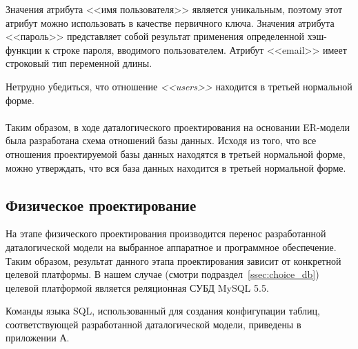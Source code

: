 Значения атрибута <<имя пользователя>> является уникальным, 
поэтому этот атрибут можно использовать в качестве первичного ключа.
Значения атрибута <<пароль>> представляет собой результат применения определенной хэш-функции
к строке пароля, вводимого пользователем.
Атрибут <<email>> имеет строковый тип переменной длины.

Нетрудно убедиться, что отношение \textit{<<users>>} находится в третьей
нормальной форме.

\paragraph{}
Таким образом, в ходе даталогического проектирования на основании ER-модели была разработана схема 
отношений базы данных.
Исходя из того, что все отношения проектируемой базы данных находятся в третьей нормальной форме,
можно утверждать, что вся база данных находится в третьей нормальной форме.


\subsection{Физическое проектирование}
\label{ssub:db_physical_stage}

На этапе физического проектирования производится перенос разработанной даталогической модели
на выбранное аппаратное и программное обеспечение.
Таким образом, результат данного этапа проектирования зависит от конкретной целевой платформы.
В нашем случае (смотри подраздел~\ref{ssec:choice_db}) целевой платформой является
реляционная СУБД MySQL 5.5.

Команды языка SQL, использованный для создания конфигупации таблиц,
соответствующей разработанной даталогической модели, 
приведены в приложении А.
